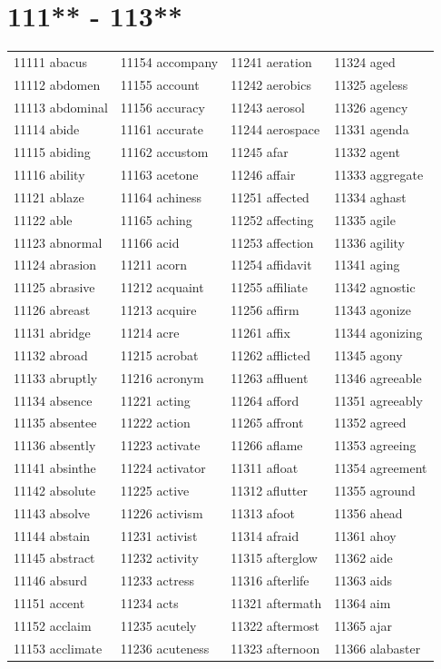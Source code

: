 \documentclass[10pt, oneside]{book}
\begin{document}
	\begin{table}
	\centering
	\section*{111** - 113**}
	\begin{tabular}{l l l l}
11111 abacus &11154 accompany &11241 aeration &11324 aged\\
11112 abdomen &11155 account &11242 aerobics &11325 ageless\\
11113 abdominal &11156 accuracy &11243 aerosol &11326 agency\\
11114 abide &11161 accurate &11244 aerospace &11331 agenda\\
11115 abiding &11162 accustom &11245 afar &11332 agent\\
11116 ability &11163 acetone &11246 affair &11333 aggregate\\
11121 ablaze &11164 achiness &11251 affected &11334 aghast\\
11122 able &11165 aching &11252 affecting &11335 agile\\
11123 abnormal &11166 acid &11253 affection &11336 agility\\
11124 abrasion &11211 acorn &11254 affidavit &11341 aging\\
11125 abrasive &11212 acquaint &11255 affiliate &11342 agnostic\\
11126 abreast &11213 acquire &11256 affirm &11343 agonize\\
11131 abridge &11214 acre &11261 affix &11344 agonizing\\
11132 abroad &11215 acrobat &11262 afflicted &11345 agony\\
11133 abruptly &11216 acronym &11263 affluent &11346 agreeable\\
11134 absence &11221 acting &11264 afford &11351 agreeably\\
11135 absentee &11222 action &11265 affront &11352 agreed\\
11136 absently &11223 activate &11266 aflame &11353 agreeing\\
11141 absinthe &11224 activator &11311 afloat &11354 agreement\\
11142 absolute &11225 active &11312 aflutter &11355 aground\\
11143 absolve &11226 activism &11313 afoot &11356 ahead\\
11144 abstain &11231 activist &11314 afraid &11361 ahoy\\
11145 abstract &11232 activity &11315 afterglow &11362 aide\\
11146 absurd &11233 actress &11316 afterlife &11363 aids\\
11151 accent &11234 acts &11321 aftermath &11364 aim\\
11152 acclaim &11235 acutely &11322 aftermost &11365 ajar\\
11153 acclimate &11236 acuteness &11323 afternoon &11366 alabaster\\
	\end{tabular}
 \end{table}
\clearpage
\end{document}
